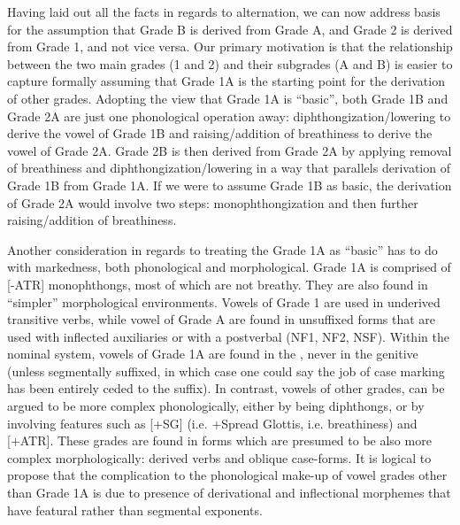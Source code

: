 \documentclass[output=paper,newtxmath,modfonts,nonflat]{langsci/langscibook}
\begin{document}
Having laid out all the facts in regards to  alternation, we can now address basis for the assumption that Grade B is derived from Grade A, and Grade 2 is derived from Grade 1, and not vice versa. Our primary motivation is that the relationship between the two main grades (1 and 2) and their subgrades (A and B) is easier to capture formally assuming that Grade 1A is the starting point for the derivation of other grades. Adopting the view that Grade 1A is “basic”, both Grade 1B and Grade 2A are just one phonological operation away: diphthongization/lowering to derive the vowel of Grade 1B and raising/addition of breathiness to derive the vowel of Grade 2A. Grade 2B is then derived from Grade 2A by applying removal of breathiness and diphthongization/lowering in a way that parallels derivation of Grade 1B from Grade 1A. If we were to assume Grade 1B as basic, the derivation of Grade 2A would involve two steps: monophthongization and then further raising/addition of breathiness. 

Another consideration in regards to treating the Grade 1A as “basic” has to do with markedness, both phonological and morphological. Grade 1A is comprised of [-ATR] monophthongs, most of which are not breathy. They are also found in “simpler” morphological environments. Vowels of Grade 1 are used in underived transitive verbs, while vowel of Grade A are found in unsuffixed forms that are used with inflected auxiliaries or with a postverbal  (NF1, NF2, NSF). Within the nominal system, vowels of Grade 1A are found in the , never in the genitive (unless segmentally suffixed, in which case one could say the job of case marking has been entirely ceded to the suffix). In contrast, vowels of other grades, can be argued to be more complex phonologically, either by being diphthongs, or by involving features such as [+SG] (i.e. +Spread Glottis, i.e. breathiness) and [+ATR]. These grades are found in forms which are presumed to be also more complex morphologically: derived verbs and oblique case-forms. It is logical to propose that the complication to the phonological make-up of vowel grades other than Grade 1A is due to presence of derivational and inflectional morphemes that have featural rather than segmental exponents.   
\end{document}
